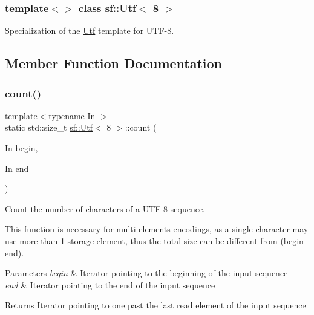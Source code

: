 \subsubsection*{template$<$$>$\newline
class sf\+::\+Utf$<$ 8 $>$}

Specialization of the \mbox{\hyperlink{classsf_1_1_utf}{Utf}} template for U\+T\+F-\/8. 

\begin{DoxyVerb}\end{DoxyVerb}
 

\subsection{Member Function Documentation}
\mbox{\label{classsf_1_1_utf_3_018_01_4_af1f15d9a772ee887be39e97431e15d32}} 
\subsubsection{\texorpdfstring{count()}{count()}}
{\footnotesize\ttfamily template$<$typename In $>$ \\
static std\+::size\+\_\+t \mbox{\hyperlink{classsf_1_1_utf}{sf\+::\+Utf}}$<$ 8 $>$\+::count (\begin{DoxyParamCaption}\item[{In}]{begin,  }\item[{In}]{end }\end{DoxyParamCaption})\hspace{0.3cm}{\ttfamily [static]}}



Count the number of characters of a U\+T\+F-\/8 sequence. 

This function is necessary for multi-\/elements encodings, as a single character may use more than 1 storage element, thus the total size can be different from (begin -\/ end).


\begin{DoxyParams}{Parameters}
{\em begin} & Iterator pointing to the beginning of the input sequence \\
\hline
{\em end} & Iterator pointing to the end of the input sequence\\
\hline
\end{DoxyParams}
\begin{DoxyReturn}{Returns}
Iterator pointing to one past the last read element of the input sequence \begin{DoxyVerb}\end{DoxyVerb}
 
\end{DoxyReturn}
\mbox{\label{classsf_1_1_utf_3_018_01_4_a59d4e8d5832961e62b263d308b72bf4b}} 
